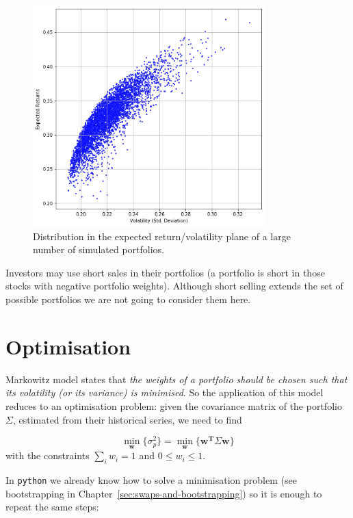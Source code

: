 \begin{figure}[hbt]
\centering
\includegraphics[width=0.8\textwidth]{figures/return_variance}
\caption{Distribution in the expected return/volatility plane of a large number of simulated portfolios.}
\label{fig:mc_portfolio}
\end{figure}

Investors may use short sales in their portfolios (a portfolio is short in those stocks with negative portfolio weights). 
Although short selling extends the set of possible portfolios we are not going to consider them here.

\section{Optimisation}\label{optimization}

Markowitz model states that \emph{the weights of a portfolio should be chosen 
such that its volatility (or its variance) is minimised}. 
So the application of this model reduces to
an optimisation problem: given the covariance matrix of the portfolio
$\Sigma$, estimated from their historical series, we need to find

\begin{equation}
	\underset{\mathbf{w}}{\min}\{\sigma_p^2\} = \underset{\mathbf{w}}{\min}\{\mathbf{w^T}\Sigma\mathbf{w}\}
\end{equation}
with the constraints \(\sum_{i}w_i = 1\) and \(0 \le w_i \le 1\).

In \texttt{python} we already know how to solve a minimisation problem
(see bootstrapping in Chapter~\ref{sec:swaps-and-bootstrapping}) 
so it is enough to repeat the same steps:

